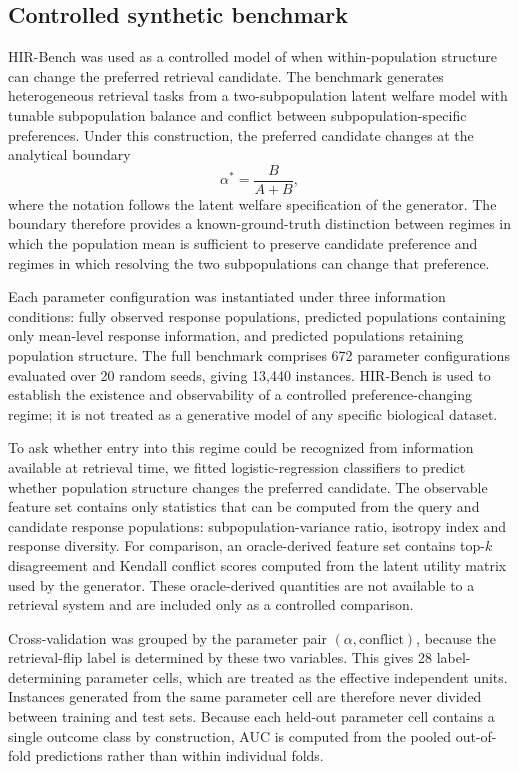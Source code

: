 \documentclass[11pt,letterpaper]{article}
\begin{document}
\subsection*{Controlled synthetic benchmark}

HIR-Bench was used as a controlled model of when within-population structure can change
the preferred retrieval candidate. The benchmark generates heterogeneous retrieval tasks
from a two-subpopulation latent welfare model with tunable subpopulation balance and
conflict between subpopulation-specific preferences. Under this construction, the preferred
candidate changes at the analytical boundary
$$
\alpha^{*}=\frac{B}{A+B},
$$
where the notation follows the latent welfare specification of the generator. The boundary
therefore provides a known-ground-truth distinction between regimes in which the population
mean is sufficient to preserve candidate preference and regimes in which resolving the two
subpopulations can change that preference.

Each parameter configuration was instantiated under three information conditions:
fully observed response populations, predicted populations containing only mean-level
response information, and predicted populations retaining population structure. The full
benchmark comprises 672 parameter configurations evaluated over 20 random seeds, giving
13,440 instances. HIR-Bench is used to establish the existence and observability of a
controlled preference-changing regime; it is not treated as a generative model of any
specific biological dataset.

To ask whether entry into this regime could be recognized from information available at
retrieval time, we fitted logistic-regression classifiers to predict whether population
structure changes the preferred candidate. The observable feature set contains only
statistics that can be computed from the query and candidate response populations:
subpopulation-variance ratio, isotropy index and response diversity. For comparison, an
oracle-derived feature set contains top-$k$ disagreement and Kendall conflict scores
computed from the latent utility matrix used by the generator. These oracle-derived
quantities are not available to a retrieval system and are included only as a controlled
comparison.

Cross-validation was grouped by the parameter pair $(\alpha,\mathrm{conflict})$, because
the retrieval-flip label is determined by these two variables. This gives 28
label-determining parameter cells, which are treated as the effective independent units.
Instances generated from the same parameter cell are therefore never divided between
training and test sets. Because each held-out parameter cell contains a single outcome
class by construction, AUC is computed from the pooled out-of-fold predictions rather
than within individual folds.
\end{document}
